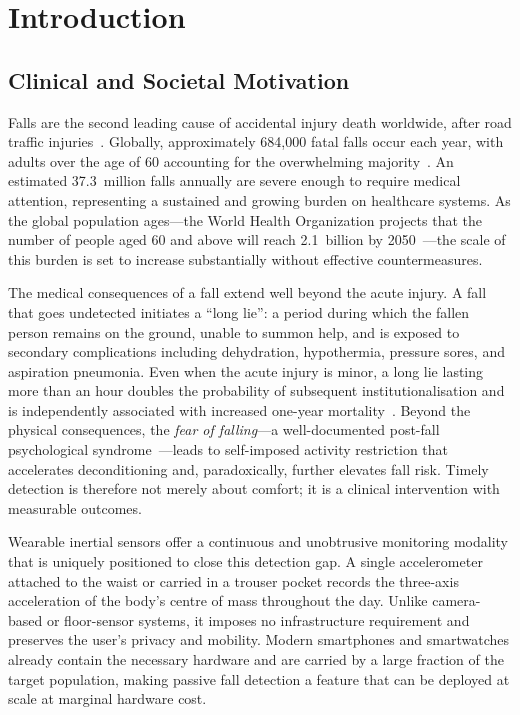 \chapter{Introduction}
\label{sec:introduction}

\section{Clinical and Societal Motivation}
\label{subsec:motivation}

Falls are the second leading cause of accidental injury death worldwide, after road
traffic injuries~\parencite{who2021falls}.  Globally, approximately 684,000 fatal falls
occur each year, with adults over the age of 60 accounting for the overwhelming
majority~\parencite{who2021falls}.  An estimated 37.3~million falls annually are severe
enough to require medical attention, representing a sustained and growing burden on
healthcare systems.  As the global population ages---the World Health Organization
projects that the number of people aged 60 and above will reach 2.1~billion by
2050~\parencite{who2022ageing}---the scale of this burden is set to increase substantially
without effective countermeasures.

The medical consequences of a fall extend well beyond the acute injury.  A fall that
goes undetected initiates a ``long lie'': a period during which the fallen person
remains on the ground, unable to summon help, and is exposed to secondary complications
including dehydration, hypothermia, pressure sores, and aspiration pneumonia.  Even
when the acute injury is minor, a long lie lasting more than an hour doubles the
probability of subsequent institutionalisation and is independently associated with
increased one-year mortality~\parencite{wild1981longlie}.  Beyond the physical consequences,
the \emph{fear of falling}---a well-documented post-fall psychological
syndrome~\parencite{tinetti1988fear}---leads to self-imposed activity restriction that
accelerates deconditioning and, paradoxically, further elevates fall risk.  Timely
detection is therefore not merely about comfort; it is a clinical intervention with
measurable outcomes.

Wearable inertial sensors offer a continuous and unobtrusive monitoring modality that
is uniquely positioned to close this detection gap.  A single accelerometer attached
to the waist or carried in a trouser pocket records the three-axis acceleration of the
body's centre of mass throughout the day.  Unlike camera-based or floor-sensor systems,
it imposes no infrastructure requirement and preserves the user's privacy and mobility.
Modern smartphones and smartwatches already contain the necessary hardware and are
carried by a large fraction of the target population, making passive fall detection a
feature that can be deployed at scale at marginal hardware cost.

